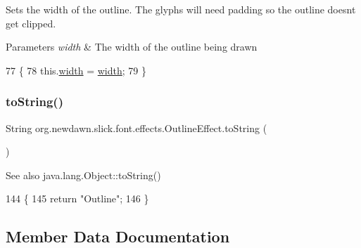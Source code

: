 Sets the width of the outline. The glyphs will need padding so the outline doesn\textquotesingle{}t get clipped.


\begin{DoxyParams}{Parameters}
{\em width} & The width of the outline being drawn \\
\hline
\end{DoxyParams}

\begin{DoxyCode}
77                                      \{
78         this.\mbox{\hyperlink{classorg_1_1newdawn_1_1slick_1_1font_1_1effects_1_1_outline_effect_aad96e33c4fb5804e7423df04e1cc1936}{width}} = \mbox{\hyperlink{classorg_1_1newdawn_1_1slick_1_1font_1_1effects_1_1_outline_effect_aad96e33c4fb5804e7423df04e1cc1936}{width}};
79     \}
\end{DoxyCode}
\mbox{\label{classorg_1_1newdawn_1_1slick_1_1font_1_1effects_1_1_outline_effect_af0c4f7e4ee8cf7282bf1521f8647185c}} 
\subsubsection{\texorpdfstring{to\+String()}{toString()}}
{\footnotesize\ttfamily String org.\+newdawn.\+slick.\+font.\+effects.\+Outline\+Effect.\+to\+String (\begin{DoxyParamCaption}{ }\end{DoxyParamCaption})\hspace{0.3cm}{\ttfamily [inline]}}

\begin{DoxySeeAlso}{See also}
java.\+lang.\+Object\+::to\+String() 
\end{DoxySeeAlso}

\begin{DoxyCode}
144                               \{
145         \textcolor{keywordflow}{return} \textcolor{stringliteral}{"Outline"};
146     \}
\end{DoxyCode}


\subsection{Member Data Documentation}
\mbox{\label{classorg_1_1newdawn_1_1slick_1_1font_1_1effects_1_1_outline_effect_a00160c4c005cb659d45c135a2798005f}} 
